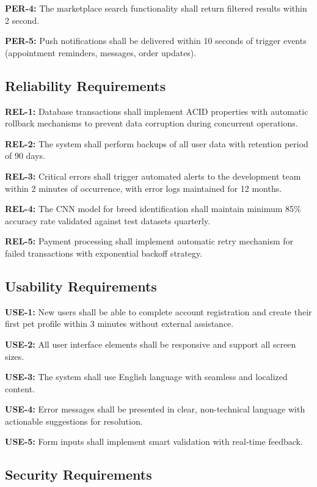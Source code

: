 \textbf{PER-4:} The marketplace search functionality shall return filtered results within 2 second.

\textbf{PER-5:} Push notifications shall be delivered within 10 seconds of trigger events (appointment reminders, messages, order updates).

\subsection{Reliability Requirements}

\textbf{REL-1:} Database transactions shall implement ACID properties with automatic rollback mechanisms to prevent data corruption during concurrent operations.

\textbf{REL-2:} The system shall perform backups of all user data with retention period of 90 days.

\textbf{REL-3:} Critical errors shall trigger automated alerts to the development team within 2 minutes of occurrence, with error logs maintained for 12 months.

\textbf{REL-4:} The CNN model for breed identification shall maintain minimum 85\% accuracy rate validated against test datasets quarterly.

\textbf{REL-5:} Payment processing shall implement automatic retry mechanism for failed transactions with exponential backoff strategy.

\subsection{Usability Requirements}

\textbf{USE-1:} New users shall be able to complete account registration and create their first pet profile within 3 minutes without external assistance.

\textbf{USE-2:} All user interface elements shall be responsive and support all screen sizes.

\textbf{USE-3:} The system shall use English language with seamless and localized content.

\textbf{USE-4:} Error messages shall be presented in clear, non-technical language with actionable suggestions for resolution.

\textbf{USE-5:} Form inputs shall implement smart validation with real-time feedback.

\subsection{Security Requirements}

